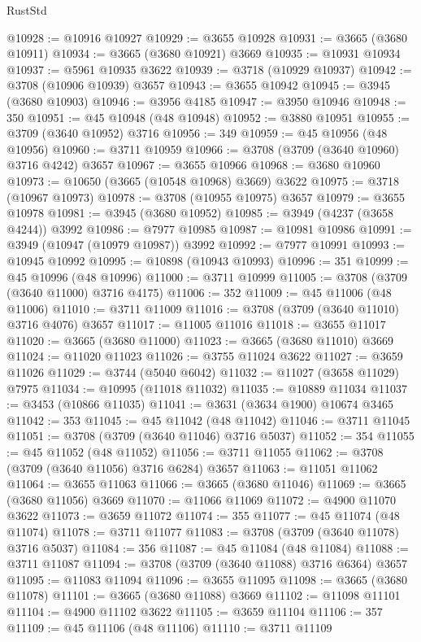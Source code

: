 \begin{lexlean}{RustStd}
\begin{coremodule}
@10928 := @10916 @10927
@10929 := @3655 @10928
@10931 := @3665 (@3680 @10911)
@10934 := @3665 (@3680 @10921) @3669
@10935 := @10931 @10934
@10937 := @5961 @10935 @3622
@10939 := @3718 (@10929 @10937)
@10942 := @3708 (@10906 @10939) @3657
@10943 := @3655 @10942
@10945 := @3945 (@3680 @10903)
@10946 := @3956 @4185
@10947 := @3950 @10946
@10948 := 350
@10951 := @45 @10948 (@48 @10948)
@10952 := @3880 @10951
@10955 := @3709 (@3640 @10952) @3716
@10956 := 349
@10959 := @45 @10956 (@48 @10956)
@10960 := @3711 @10959
@10966 := @3708 (@3709 (@3640 @10960) @3716 @4242) @3657
@10967 := @3655 @10966
@10968 := @3680 @10960
@10973 := @10650 (@3665 (@10548 @10968) @3669) @3622
@10975 := @3718 (@10967 @10973)
@10978 := @3708 (@10955 @10975) @3657
@10979 := @3655 @10978
@10981 := @3945 (@3680 @10952)
@10985 := @3949 (@4237 (@3658 @4244)) @3992
@10986 := @7977 @10985
@10987 := @10981 @10986
@10991 := @3949 (@10947 (@10979 @10987)) @3992
@10992 := @7977 @10991
@10993 := @10945 @10992
@10995 := @10898 (@10943 @10993)
@10996 := 351
@10999 := @45 @10996 (@48 @10996)
@11000 := @3711 @10999
@11005 := @3708 (@3709 (@3640 @11000) @3716 @4175)
@11006 := 352
@11009 := @45 @11006 (@48 @11006)
@11010 := @3711 @11009
@11016 := @3708 (@3709 (@3640 @11010) @3716 @4076) @3657
@11017 := @11005 @11016
@11018 := @3655 @11017
@11020 := @3665 (@3680 @11000)
@11023 := @3665 (@3680 @11010) @3669
@11024 := @11020 @11023
@11026 := @3755 @11024 @3622
@11027 := @3659 @11026
@11029 := @3744 (@5040 @6042)
@11032 := @11027 (@3658 @11029) @7975
@11034 := @10995 (@11018 @11032)
@11035 := @10889 @11034
@11037 := @3453 (@10866 @11035)
@11041 := @3631 (@3634 @1900) @10674 @3465
@11042 := 353
@11045 := @45 @11042 (@48 @11042)
@11046 := @3711 @11045
@11051 := @3708 (@3709 (@3640 @11046) @3716 @5037)
@11052 := 354
@11055 := @45 @11052 (@48 @11052)
@11056 := @3711 @11055
@11062 := @3708 (@3709 (@3640 @11056) @3716 @6284) @3657
@11063 := @11051 @11062
@11064 := @3655 @11063
@11066 := @3665 (@3680 @11046)
@11069 := @3665 (@3680 @11056) @3669
@11070 := @11066 @11069
@11072 := @4900 @11070 @3622
@11073 := @3659 @11072
@11074 := 355
@11077 := @45 @11074 (@48 @11074)
@11078 := @3711 @11077
@11083 := @3708 (@3709 (@3640 @11078) @3716 @5037)
@11084 := 356
@11087 := @45 @11084 (@48 @11084)
@11088 := @3711 @11087
@11094 := @3708 (@3709 (@3640 @11088) @3716 @6364) @3657
@11095 := @11083 @11094
@11096 := @3655 @11095
@11098 := @3665 (@3680 @11078)
@11101 := @3665 (@3680 @11088) @3669
@11102 := @11098 @11101
@11104 := @4900 @11102 @3622
@11105 := @3659 @11104
@11106 := 357
@11109 := @45 @11106 (@48 @11106)
@11110 := @3711 @11109

\end{coremodule}
\end{lexlean}

